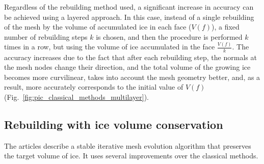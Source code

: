 \documentclass[
11pt,%
tightenlines,%
twoside,%
onecolumn,%
nofloats,%
nobibnotes,%
nofootinbib,%
superscriptaddress,%
noshowpacs,%
centertags]%
{revtex4}
\begin{document}
Regardless of the rebuilding method used, a significant increase in accuracy can be achieved using a layered \cite{BourgaultCote} approach.
In this case, instead of a single rebuilding of the mesh by the volume of accumulated ice in each face ($V(f)$), a fixed number of rebuilding steps $k$ is chosen, and then the procedure is performed $k$ times in a row, but using the volume of ice accumulated in the face $\frac{V(f)}{k}$.
The accuracy increases due to the fact that after each rebuilding step, the normals at the mesh nodes change their direction, and the total volume of the growing ice becomes more curvilinear, takes into account the mesh geometry better, and, as a result, more accurately corresponds to the initial value of $V(f)$ (Fig.~\ref{fig:pic_classical_methods_multilayer}).

\subsection{Rebuilding with ice volume conservation}

The articles \cite{Thompson,Tong} describe a stable iterative mesh evolution algorithm that preserves the target volume of ice.
It uses several improvements over the classical methods.
\end{document}
